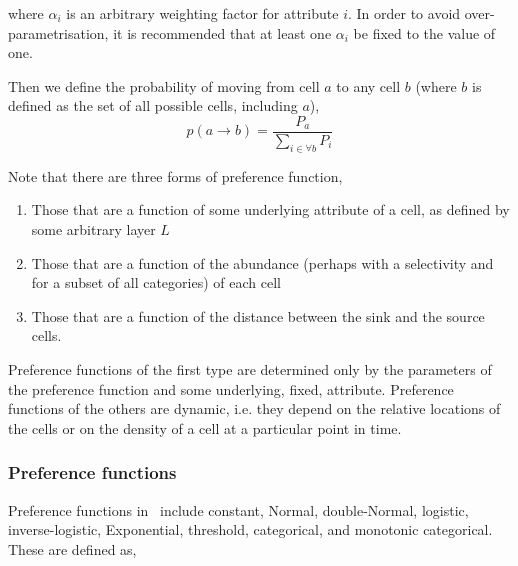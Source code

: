 where $\alpha_i$ is an arbitrary weighting factor for attribute $i$. In order to avoid over-parametrisation, it is recommended that at least one $\alpha_i$ be fixed to the value of one.

Then we define the probability of moving from cell $a$ to any cell $b$ (where $b$ is defined as the set of all possible cells, including $a$),
\begin{equation}
  p(a\rightarrow b) = \frac{P_a}{\sum\limits_{i \in \forall b} P_i}
\end{equation}

Note that there are three forms of preference function,
\begin{enumerate}
\item Those that are a function of some underlying attribute of a cell, as defined by some arbitrary layer $L$
\item Those that are a function of the abundance (perhaps with a selectivity and for a subset of all categories) of each cell
\item Those that are a function of the distance between the sink and the source cells. 
\end{enumerate} 

Preference functions of the first type are determined only by the parameters of the preference function and some underlying, fixed, attribute. Preference functions of the others are dynamic, i.e. they depend on the relative locations of the cells or on the density of a cell at a particular point in time.

\subsubsection*{Preference functions}

Preference functions in \SPM\ include constant, Normal, double-Normal, logistic, inverse-logistic, Exponential, threshold, categorical, and monotonic categorical. These are defined as,


